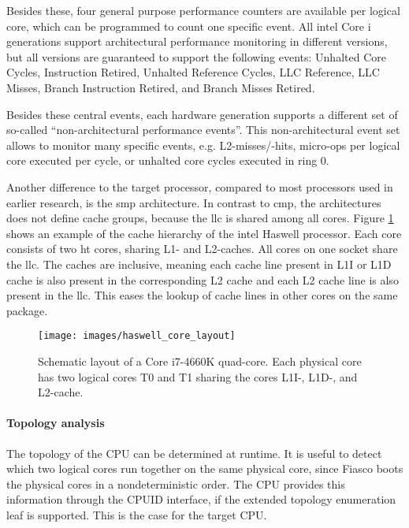 Besides these, four general purpose performance counters are available per
logical core, which can be programmed to count one specific event.
All \gls{intel} Core i generations support architectural performance monitoring
in different versions, but all versions are guaranteed to support the following
events:
Unhalted Core Cycles, Instruction Retired, Unhalted Reference Cycles,
LLC Reference, LLC Misses, Branch Instruction Retired,
and Branch Misses Retired.

Besides these central events, each hardware generation supports a different set
of so-called ``non-architectural performance events''.
This non-architectural event set allows to monitor many specific events, e.g.
L2-misses/-hits, micro-ops per logical core executed per cycle, or unhalted
core cycles executed in ring 0.

Another difference to the target processor, compared to most processors used in
earlier research, is the \gls{smp} architecture.
In contrast to \gls{cmp}, the architectures does not define cache groups,
because the \gls{llc} is shared among all cores.
Figure \ref{state:fig:core_layout} shows an example of the cache hierarchy of
the \gls{intel} Haswell processor.
Each core consists of two \gls{ht} cores, sharing L1- and L2-caches.
All cores on one socket share the \gls{llc}.
The caches are inclusive, meaning each cache line present in L1I or L1D
cache is also present in the corresponding L2 cache and each L2 cache line is
also present in the \gls{llc}.
This eases the lookup of cache lines in other cores on the same package.


\begin{figure}[h!]
  \centering
  \texttt{[image: images/haswell\_core\_layout]}
  \caption{Schematic layout of a Core i7-4660K quad-core.
    Each physical core has two logical cores T0 and T1 sharing the cores L1I-,
    L1D-, and L2-cache.}
  \label{state:fig:core_layout}
\end{figure}

\paragraph{Topology analysis}
The topology of the CPU can be determined at runtime.
It is useful to detect which two logical cores run together on the same
physical core, since Fiasco boots the physical cores in a nondeterministic order.
The CPU provides this information through the CPUID interface, if the
extended topology enumeration leaf is supported. This is the case for the
target CPU.

